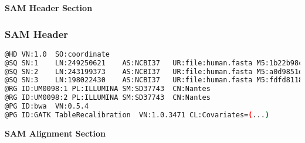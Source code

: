 \documentclass{beamer}
\newcommand{\centeredtitle}[1]{
\begin{center}
    \Huge{\bf{#1}}
\end{center}
}
\newcommand{\hugeslide}[1]{
\begin{frame}
\centeredtitle{#1}
\end{frame}
}
\begin{document}
\hugeslide{SAM Header Section}


\begin{frame}[fragile]
\frametitle{SAM Header}
\begin{framed}\tiny
\begin{lstlisting}[language=bash,basicstyle=\tiny]
@HD	VN:1.0	SO:coordinate
@SQ	SN:1	LN:249250621	AS:NCBI37	UR:file:human.fasta	M5:1b22b98cdeb4a9304cb5d48026a85128
@SQ	SN:2	LN:243199373	AS:NCBI37	UR:file:human.fasta	M5:a0d9851da00400dec1098a9255ac712e
@SQ	SN:3	LN:198022430	AS:NCBI37	UR:file:human.fasta	M5:fdfd811849cc2fadebc929bb925902e5
@RG	ID:UM0098:1	PL:ILLUMINA	SM:SD37743	CN:Nantes
@RG	ID:UM0098:2	PL:ILLUMINA	SM:SD37743	CN:Nantes
@PG	ID:bwa	VN:0.5.4
@PG	ID:GATK TableRecalibration	VN:1.0.3471	CL:Covariates=(...)
\end{lstlisting}
\end{framed}
\end{frame}

\hugeslide{SAM Alignment Section}
\end{document}
